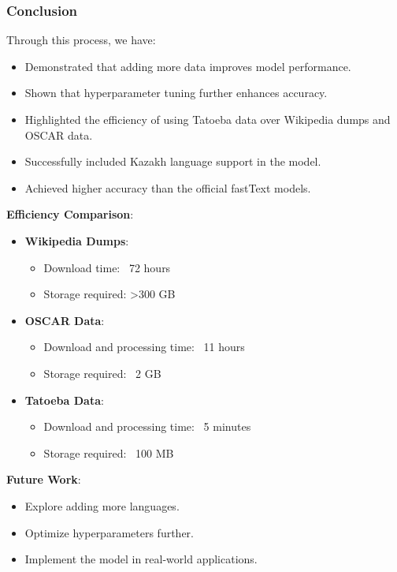 \documentclass{beamer}
\begin{document}
\begin{frame}
    \frametitle{Conclusion}
    Through this process, we have:

    \begin{itemize}
        \item Demonstrated that adding more data improves model performance.
        \item Shown that hyperparameter tuning further enhances accuracy.
        \item Highlighted the efficiency of using Tatoeba data over Wikipedia dumps and OSCAR data.
        \item Successfully included Kazakh language support in the model.
        \item Achieved higher accuracy than the official fastText models.
    \end{itemize}

    \textbf{Efficiency Comparison}:

    \begin{itemize}
        \item \textbf{Wikipedia Dumps}:
        \begin{itemize}
            \item Download time: ~72 hours
            \item Storage required: >300 GB
        \end{itemize}
        \item \textbf{OSCAR Data}:
        \begin{itemize}
            \item Download and processing time: ~11 hours
            \item Storage required: ~2 GB
        \end{itemize}
        \item \textbf{Tatoeba Data}:
        \begin{itemize}
            \item Download and processing time: ~5 minutes
            \item Storage required: ~100 MB
        \end{itemize}
    \end{itemize}

    \textbf{Future Work}:

    \begin{itemize}
        \item Explore adding more languages.
        \item Optimize hyperparameters further.
        \item Implement the model in real-world applications.
    \end{itemize}
\end{frame}
\end{document}
